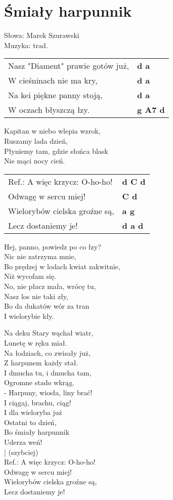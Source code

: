 \section{Śmiały harpunnik}

Słowa: Marek Szurawski\\
Muzyka:  trad.

\vspace{2em}
\begin{tabular}{@{}p{7cm}@{}l@{}}
Nasz "Diament" prawie gotów już, & \bfseries d a\\
W cieśninach nie ma kry, & \bfseries d a\\
Na kei piękne panny stoją, & \bfseries d a\\
W oczach błyszczą łzy.  & \bfseries g A7 d\\
\end{tabular}

Kapitan w niebo wlepia wzrok, \\
Ruszamy lada dzień, \\
Płyniemy tam, gdzie słońca blask \\
Nie mąci nocy cień. \\


\vspace{1em}
\begin{tabular}{@{}p{7cm}@{}l@{}}
Ref.: A więc krzycz: O-ho-ho! & \bfseries  d C d\\
Odwagę w sercu miej!  & \bfseries  C d\\
Wielorybów cielska groźne są,  & \bfseries  a g\\
Lecz dostaniemy je! & \bfseries  d a d\\
\end{tabular}

Hej, panno, powiedz po co łzy? \\
Nic nie zatrzyma mnie, \\
Bo prędzej w lodach kwiat zakwitnie, \\
Niż wycofam się. \\
No, nie płacz mała, wrócę tu, \\
Nasz los nie taki zły, \\
Bo da dukatów wór za tran \\
I wielorybie kły. \\
\newpage

Na deku Stary wąchał wiatr, \\
Lunetę w ręku miał. \\
Na łodziach, co zwisały już, \\
Z harpunem każdy stał. \\
I dmucha tu, i dmucha tam, \\
Ogromne stado wkrąg. \\
- Harpuny, wiosła, liny brać! \\
I ciągaj, brachu, ciąg! \\

I dla wieloryba już \\
Ostatni to dzień, \\
Bo śmiały harpunnik \\
Uderza weń! \\

| (szybciej) \\
Ref.: A więc krzycz: O-ho-ho! \\
Odwagę w sercu miej! \\
Wielorybów cielska groźne są, \\
Lecz dostaniemy je!
